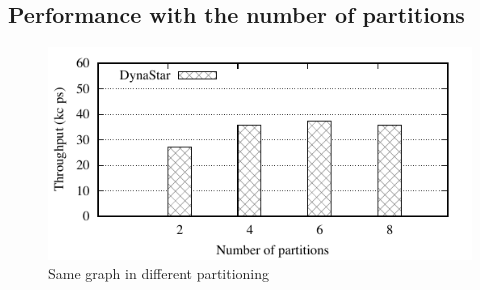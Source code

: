 \subsection{Performance with the number of partitions}
\label{sec:evaluation:results}

\begin{figure}[ht]
	\includegraphics{figures/experiments/throughput-avg-vary-partition}
	\caption{Same graph in different partitioning}
	\label{fig:4p1p_varying_partition_size}
\end{figure}

